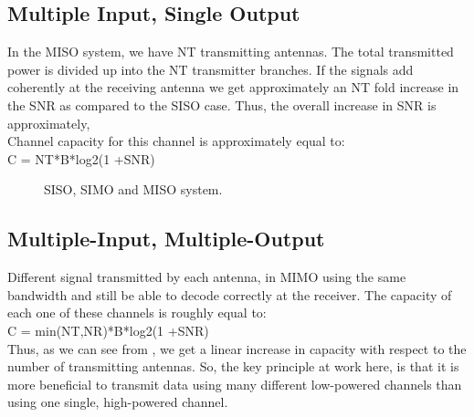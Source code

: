 \documentclass[12pt]{report}
\begin{document}
\subsection*{Multiple Input, Single Output}
In the MISO system, we have NT transmitting antennas. The total
transmitted power is divided up into the NT transmitter branches. If the
signals add coherently at the receiving antenna we get approximately
an NT fold increase in the SNR as compared to the SISO case. Thus,
the overall increase in SNR is approximately,\\
Channel capacity for this channel is approximately equal to:\\
C = NT*B*log2(1 +SNR)


\begin{figure}[!hbt]
		\begin{center}
		\caption{SISO, SIMO and MISO system.}
		\label{fig:tf_plot}
		\end{center}
	\end{figure}
    \subsection*{Multiple-Input, Multiple-Output}
Different signal transmitted by each antenna, in MIMO using the same
bandwidth and still be able to decode correctly at the receiver. The
capacity of each one of these channels is roughly equal to:\\
C = min(NT,NR)*B*log2(1 +SNR)\\	
Thus, as we can see from , we get a linear increase in capacity with respect to the number of transmitting antennas. So, the key principle at
work here, is that it is more beneficial to transmit data using many different low-powered channels than using one single, high-powered channel.
\end{document}

